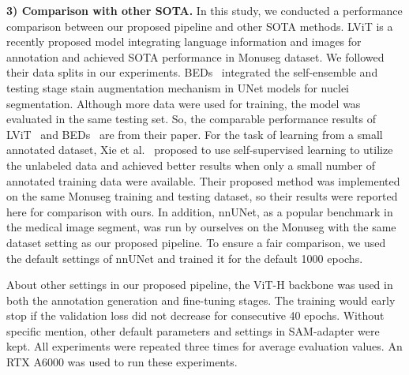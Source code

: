 \documentclass[conference]{IEEEtran}
\begin{document}
\textbf{3) Comparison with other SOTA.}
In this study, we conducted a performance comparison between our proposed pipeline and other SOTA methods. LViT \cite{li2022lvit} is a recently proposed model integrating language information and images for annotation and achieved SOTA performance in Monuseg dataset. We followed their data splits in our experiments. BEDs~\cite{li2021beds} 
integrated the self-ensemble and testing
stage stain augmentation mechanism in  UNet models for nuclei segmentation. Although more data were used for training, the model was evaluated in the same testing set. So, the comparable performance results of LViT~\cite{li2022lvit} and BEDs~\cite{li2021beds} are from their paper. For the task of learning from a small annotated dataset, Xie et al.~\cite{xie2020instance} proposed to use self-supervised learning to utilize the unlabeled data and achieved better results when only a small number of annotated training data were available. Their proposed method was implemented on the same Monuseg training and testing dataset, so their results were reported here for comparison with ours. In addition, nnUNet, as a popular benchmark in the medical image segment, was run by ourselves on the Monuseg with the same dataset setting as our proposed pipeline. To ensure a fair comparison, we used the default settings of nnUNet and trained it for the default 1000 epochs.



About other settings in our proposed pipeline, the ViT-H backbone was used in both the annotation generation and fine-tuning stages. The training would early stop if the validation loss did not decrease for consecutive 40 epochs. Without specific mention, other default parameters and settings in SAM-adapter\cite{chen2023sam} were kept. All experiments were repeated three times for average evaluation values. An RTX A6000 was used to run these experiments. 


\end{document}
